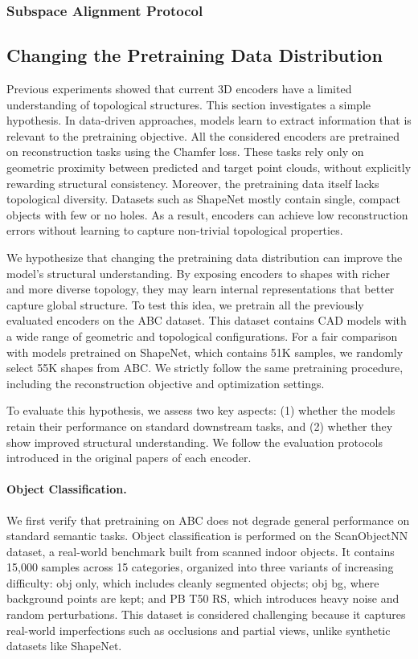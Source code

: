 \subsubsection{Subspace Alignment Protocol}
\label{sssec:subspace_alignment_protocol}

\subsection{Changing the Pretraining Data Distribution}
\label{ssec:changing_pretraining_data_distribution}

Previous experiments showed that current 3D encoders have a limited understanding of topological structures. This section investigates a simple hypothesis. In data-driven approaches, models learn to extract information that is relevant to the pretraining objective. All the considered encoders are pretrained on reconstruction tasks using the Chamfer loss. These tasks rely only on geometric proximity between predicted and target point clouds, without explicitly rewarding structural consistency. Moreover, the pretraining data itself lacks topological diversity. Datasets such as ShapeNet mostly contain single, compact objects with few or no holes. As a result, encoders can achieve low reconstruction errors without learning to capture non-trivial topological properties.


We hypothesize that changing the pretraining data distribution can improve the model's structural understanding. By exposing encoders to shapes with richer and more diverse topology, they may learn internal representations that better capture global structure. To test this idea, we pretrain all the previously evaluated encoders on the ABC dataset. This dataset contains CAD models with a wide range of geometric and topological configurations. For a fair comparison with models pretrained on ShapeNet, which contains 51K samples, we randomly select 55K shapes from ABC. We strictly follow the same pretraining procedure, including the reconstruction objective and optimization settings.

To evaluate this hypothesis, we assess two key aspects: (1) whether the models retain their performance on standard downstream tasks, and (2) whether they show improved structural understanding. We follow the evaluation protocols introduced in the original papers of each encoder.

\paragraph{Object Classification.}
We first verify that pretraining on ABC does not degrade general performance on standard semantic tasks. Object classification is performed on the ScanObjectNN dataset, a real-world benchmark built from scanned indoor objects. It contains 15,000 samples across 15 categories, organized into three variants of increasing difficulty: obj only, which includes cleanly segmented objects; obj bg, where background points are kept; and PB T50 RS, which introduces heavy noise and random perturbations. This dataset is considered challenging because it captures real-world imperfections such as occlusions and partial views, unlike synthetic datasets like ShapeNet.

